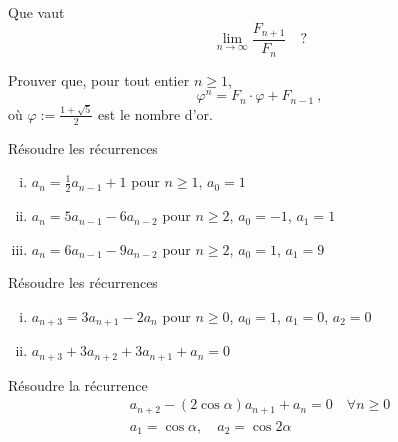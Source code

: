 \begin{exo} 
Que vaut
$$
\lim_{n \to \infty} \frac{F_{n+1}}{F_n} \quad ?
$$
\end{exo}


\begin{exo} 
Prouver que, pour tout entier $n \geqslant 1$, 
$$
\varphi^n = F_n \cdot \varphi + F_{n-1}\ ,
$$
o\`u $\varphi := \frac{1+\sqrt{5}}{2}$ est le {\DEF nombre d'or}.
\end{exo}


\begin{exo}
R\'esoudre les r\'ecurrences 
%
\begin{enumerate}[(i)]
\item $a_n = \frac{1}{2} a_{n-1} + 1$ pour $n \geqslant 1$,\hfill
 $a_0 = 1$

\item $a_n = 5a_{n-1} - 6a_{n-2}$ pour $n \geqslant 2$,\hfill
 $a_0 = -1$, \quad $a_1 = 1$

\item $a_n = 6a_{n-1} - 9a_{n-2}$ pour $n \geqslant 2$,\hfill
 $a_0 = 1$, \quad $a_1 = 9$

\end{enumerate}
\end{exo}


\begin{exo}
R\'esoudre les r\'ecurrences 
%
\begin{enumerate}[(i)]

\item $a_{n+3} = 3 a_{n+1} - 2 a_{n}$ pour $n \geqslant 0$,\hfill
      $a_0 = 1$, \quad $a_1 = 0$, \quad $a_2 = 0$
      
\item $a_{n+3} + 3 a_{n+2} + 3 a_{n+1} + a_n = 0$

\end{enumerate}
\end{exo}


\begin{exo}
R\'esoudre la r\'ecurrence
$$
\begin{array}{ll}
a_{n+2} - (2 \cos \alpha) a_{n+1} + a_n = 0\quad \forall n \geqslant 0\\
a_1 = \cos \alpha, \quad a_2 = \cos 2 \alpha
\end{array}
$$
\end{exo}

